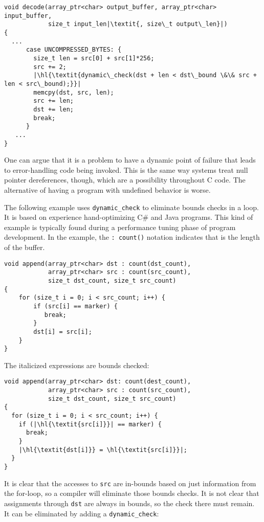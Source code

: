 \begin{lstlisting}[escapechar=\|]
void decode(array_ptr<char> output_buffer, array_ptr<char> input_buffer,
            size_t input_len|\textit{, size\_t output\_len}|)
{
  ...
      case UNCOMPRESSED_BYTES: {
        size_t len = src[0] + src[1]*256;
        src += 2;
        |\hl{\textit{dynamic\_check(dst + len < dst\_bound \&\& src + len < src\_bound);}}|
        memcpy(dst, src, len);
        src += len;
        dst += len; 
        break;
      }
   ...
}
\end{lstlisting}

One can argue that it is a problem to have a dynamic point of failure
that leads to error-handling code being invoked. This is the same way
systems treat null pointer dereferences, though, which are a possibility
throughout C code. The alternative of having a program with undefined
behavior is worse.

The following example uses \lstinline+dynamic_check+ to eliminate bounds
checks in a loop. It is based on experience hand-optimizing C\# and Java
programs. This kind of example is typically found during a performance
tuning phase of program development. In the example, 
the \lstinline|: count(|\lstinline|)| notation indicates that  is the
length of the buffer.

\begin{lstlisting}
void append(array_ptr<char> dst : count(dst_count),
            array_ptr<char> src : count(src_count), 
            size_t dst_count, size_t src_count)
{ 
    for (size_t i = 0; i < src_count; i++) {
        if (src[i] == marker) {
           break;
        }
        dst[i] = src[i];
    }
}
\end{lstlisting}

The italicized expressions are bounds checked:
\begin{lstlisting}[escapechar=\|]
void append(array_ptr<char> dst: count(dest_count),
            array_ptr<char> src : count(src_count),
            size_t dst_count, size_t src_count)
{
  for (size_t i = 0; i < src_count; i++) {
    if (|\hl{\textit{src[i]}}| == marker) {
      break;
    }
    |\hl{\textit{dst[i]}} = \hl{\textit{src[i]}}|;
  }
}
\end{lstlisting}

It is clear that the accesses to \lstinline+src+ are in-bounds based on
just information from the for-loop, so a compiler will eliminate those
bounds checks. It is not clear that assignments through \lstinline+dst+ are
always in bounds, so the check there must remain. It can be eliminated
by adding a \lstinline+dynamic_check+:

